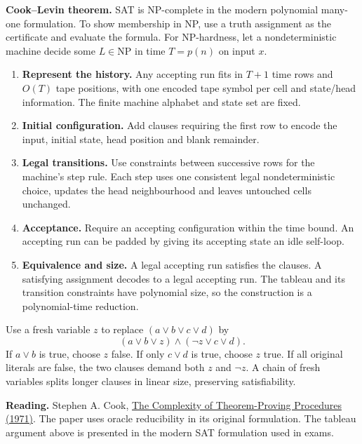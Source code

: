 \documentclass[12pt,a4paper]{article}
\begin{document}
\textbf{Cook--Levin theorem.} SAT is NP-complete in the modern polynomial many-one formulation. To show membership in NP, use a truth assignment as the certificate and evaluate the formula. For NP-hardness, let a nondeterministic machine decide some $L\in\mathrm{NP}$ in time $T=p(n)$ on input $x$.
\begin{enumerate}[leftmargin=*, itemsep=3pt, topsep=4pt]
  \item \textbf{Represent the history.} Any accepting run fits in $T+1$ time rows and $O(T)$ tape positions, with one encoded tape symbol per cell and state/head information. The finite machine alphabet and state set are fixed.
  \item \textbf{Initial configuration.} Add clauses requiring the first row to encode the input, initial state, head position and blank remainder.
  \item \textbf{Legal transitions.} Use constraints between successive rows for the machine's step rule. Each step uses one consistent legal nondeterministic choice, updates the head neighbourhood and leaves untouched cells unchanged.
  \item \textbf{Acceptance.} Require an accepting configuration within the time bound. An accepting run can be padded by giving its accepting state an idle self-loop.
  \item \textbf{Equivalence and size.} A legal accepting run satisfies the clauses. A satisfying assignment decodes to a legal accepting run. The tableau and its transition constraints have polynomial size, so the construction is a polynomial-time reduction.
\end{enumerate}
\begin{tcolorbox}[examplebox, title={Splitting a long CNF clause}]
Use a fresh variable $z$ to replace $(a\lor b\lor c\lor d)$ by
\[
(a\lor b\lor z)\land(\neg z\lor c\lor d).
\]
If $a\lor b$ is true, choose $z$ false. If only $c\lor d$ is true, choose $z$ true. If all original literals are false, the two clauses demand both $z$ and $\neg z$. A chain of fresh variables splits longer clauses in linear size, preserving satisfiability.
\end{tcolorbox}

\textbf{Reading.} Stephen A. Cook, \href{https://www.cs.cmu.edu/~15455/resources/Cook1971-complx-thm-proof.pdf}{The Complexity of Theorem-Proving Procedures (1971)}. The paper uses oracle reducibility in its original formulation. The tableau argument above is presented in the modern SAT formulation used in exams.
\end{document}
